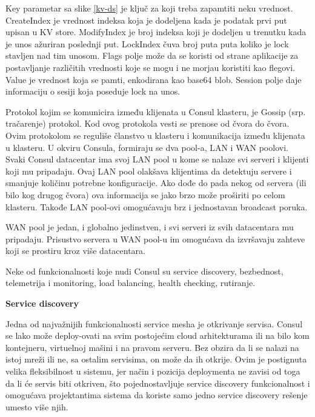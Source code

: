 \documentclass[a4paper,12pt]{report}
\begin{document}
Key parametar sa slike \ref{kv-ds} je ključ za koji treba zapamtiti neku vrednost. CreateIndex je vrednost indeksa koja je dodeljena kada je podatak prvi put upisan u KV store. ModifyIndex je broj indeksa koji je dodeljen u trenutku kada je unos ažuriran poslednji put. LockIndex čuva broj puta puta koliko je lock stavljen nad tim unosom. Flags polje može da se koristi od strane aplikacije za postavljanje različitih vrednosti koje se mogu i ne morjau koristiti kao flegovi. Value je vrednost koja se pamti, enkodirana kao base64 blob. Session polje daje informaciju o sesiji koja poseduje lock na unos. \newline

Protokol kojim se komunicira između klijenata u Consul klasteru, je Gossip (srp. tračarenje) protokol. Kod ovog protokola vesti se prenose od čvora do čvora. Ovim protokolom se reguliše članstvo u klasteru i komunikacija između klijenata u klasteru. U okviru Consula, formiraju se dva pool-a, LAN i WAN poolovi. Svaki Consul datacentar ima svoj LAN pool u kome se nalaze svi serveri i klijenti koji mu pripadaju. Ovaj LAN pool olakšava klijentima da detektuju servere i smanjuje količinu potrebne konfiguracije. Ako dođe do pada nekog od servera (ili bilo kog drugog čvora) ova informacija se jako brzo može proširiti po celom klasteru. Takođe LAN pool-ovi omogućavaju brz i jednostavan broadcast poruka. \newline

WAN pool je jedan, i globalno jedinstven, i svi serveri iz svih datacentara mu pripadaju. Prisustvo servera u WAN pool-u im omogućava da izvršavaju zahteve koji se prostiru kroz više datacentara. \newline

Neke od funkcionalnosti koje nudi Consul su service discovery, bezbednost, telemetrija i monitoring, load balancing, health checking, rutiranje. \newline

\textbf{Service discovery}\newline

Jedna od najvažnijih funkcionalnosti service mesha je otkrivanje servisa. Consul se lako može deploy-ovati na svim postojećim cloud arhitekturama ili na bilo kom kontejneru, virtuelnoj mašini i na pravom serveru. Bez obzira da li se nalazi na istoj mreži ili ne, sa ostalim servisima, on može da ih otkrije. Ovim je postignuta velika fleksibilnost u sistemu, jer način i pozicija deploymenta ne zavisi od toga da li će servis biti otkriven, što pojednostavljuje service discovery funkcionalnost i omogućava projektantima sistema da koriste samo jedno service discovery rešenje umesto više njih. \newline
\end{document}
